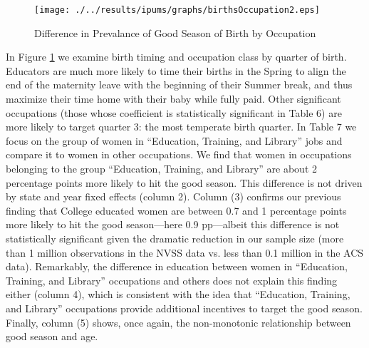 \documentclass[a4paper, 11.5 pt]{article}
\theoremstyle{plain}
\begin{document}
\begin{doublespace}
\begin{figure}[htpb!]
\begin{center}
  \centering
  \caption{Difference in Prevalance of Good Season of Birth by Occupation}
  \texttt{[image: ./../results/ipums/graphs/birthsOccupation2.eps]}
  \label{fig:goodByOcc2}
\end{center}
\vspace{-5mm}
\end{figure}

In Figure \ref{fig:goodByOcc2} we examine birth timing and occupation class by quarter of birth. Educators are much more likely to time their births in the Spring to align the end of the maternity leave with the beginning of their Summer break, and thus maximize their time home with their baby while fully paid. Other significant occupations (those whose coefficient is statistically significant in Table 6) are more likely to target quarter 3: the most temperate birth quarter. In Table 7 we focus on the group of women in ``Education, Training, and Library'' jobs and compare it to women in other occupations. We find that women in occupations belonging to the group ``Education, Training, and Library'' are about 2 percentage points more likely to hit the good season. This difference is not driven by state and year fixed effects (column 2). Column (3) confirms our previous finding that College educated women are between 0.7 and 1 percentage points more likely to hit the good season---here 0.9 pp---albeit this difference is not statistically significant given the dramatic reduction in our sample size (more than 1 million observations in the NVSS data vs. less than 0.1 million in the ACS data). Remarkably, the difference in education between women in ``Education, Training, and Library'' occupations and others  does not explain this finding either (column 4), which is consistent with the idea that ``Education, Training, and Library'' occupations provide additional incentives to target the good season. Finally, column (5) shows, once again, the non-monotonic relationship between good season and age.


\end{doublespace}
\end{document}
